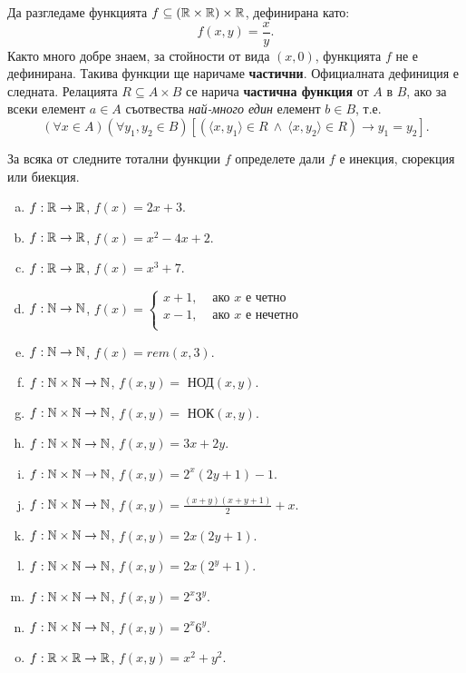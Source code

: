 Да разгледаме функцията $f \subseteq (\mathbb{R}\times\mathbb{R})\times\mathbb{R}$, дефинирана като:
\[f(x,y) = \frac{x}{y}.\]
Както много добре знаем, за стойности от вида $(x,0)$, функцията $f$ не е дефинирана.
Такива функции ще наричаме {\bf частични}.
Официалната дефиниция е следната.
Релацията $R \subseteq A\times B$ се нарича {\bf частична функция} от $A$ в $B$, ако
за всеки елемент $a\in A$ съотвества {\em най-много един} елемент $b \in B$, т.е.
\[(\forall x\in A)(\forall y_1,y_2 \in B)[(\langle{x,y_1}\rangle\in R\ \wedge\ \langle{x,y_2}\rangle\in R) \rightarrow y_1 = y_2].\]

\begin{problem}
  За всяка от следните тотални функции $f$ определете дали $f$ е
  инекция, сюрекция или биекция.
  \begin{enumerate}[a)]
  \item
    $f: \mathbb{R}\rightarrow \mathbb{R}$, $f(x) = 2x+3$.
  \item
    $f: \mathbb{R}\rightarrow \mathbb{R}$, $f(x) = x^2 - 4x +2$.
  \item 
    $f: \mathbb{R}\rightarrow \mathbb{R}$, $f(x) = x^3+7$.    
  \item
    $f: \mathbb{N}\rightarrow \mathbb{N}$, 
    $f(x) = 
      \begin{cases}
        x+1, & \mbox{ ако }x\mbox{ е четно}\\
        x-1, & \mbox{ ако }x\mbox{ е нечетно}\\
      \end{cases}$
    \item
    $f: \mathbb{N}\rightarrow \mathbb{N}$, $f(x) = rem(x,3)$.
  \item 
    $f: \mathbb{N}\times\mathbb{N} \rightarrow \mathbb{N}$,
    $f(x, y) = \mbox{ НОД}(x,y)$.
  \item 
    $f: \mathbb{N}\times\mathbb{N} \rightarrow \mathbb{N}$,
    $f(x, y) = \mbox{ НОК}(x,y)$.
  \item 
    $f: \mathbb{N} \times \mathbb{N}\rightarrow \mathbb{N}$,
    $f(x, y) = 3x+2y$.
  \item 
    $f: \mathbb{N} \times \mathbb{N}\rightarrow \mathbb{N}$,
    $f(x, y) = 2^x(2y+1)-1$.
  \item 
    $f: \mathbb{N} \times \mathbb{N}\rightarrow \mathbb{N}$,
    $f(x, y) = \frac{(x+y)(x+y+1)}{2} + x$.
  \item 
    $f: \mathbb{N} \times \mathbb{N}\rightarrow \mathbb{N}$,
    $f(x, y) = 2x(2y+1)$.
  \item
    $f: \mathbb{N} \times \mathbb{N}\rightarrow \mathbb{N}$,
    $f(x, y) = 2x(2^y+1)$.
  \item
    $f: \mathbb{N} \times \mathbb{N}\rightarrow \mathbb{N}$,
    $f(x, y) = 2^x3^y$.
  \item
    $f: \mathbb{N} \times \mathbb{N}\rightarrow \mathbb{N}$,
    $f(x, y) = 2^x6^y$.
  \item 
    $f: \mathbb{R}\times\mathbb{R}\rightarrow \mathbb{R}$,
    $f(x, y) = x^2+y^2$.
  \end{enumerate}
\end{problem}

